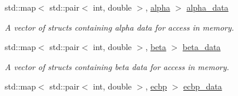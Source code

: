 \begin{DoxyCompactItemize}
\item 
std\+::map$<$ std\+::pair$<$ int, double $>$, \hyperlink{structpyne_1_1alpha}{alpha} $>$ \hyperlink{namespacepyne_a535b6ec192f55087092c07ee478bc11d}{alpha\+\_\+data}\hypertarget{namespacepyne_a535b6ec192f55087092c07ee478bc11d}{}\label{namespacepyne_a535b6ec192f55087092c07ee478bc11d}

\begin{DoxyCompactList}\small\item\em A vector of structs containing alpha data for access in memory. \end{DoxyCompactList}\item 
std\+::map$<$ std\+::pair$<$ int, double $>$, \hyperlink{structpyne_1_1beta}{beta} $>$ \hyperlink{namespacepyne_a5a5d547521d918978adccc01a8cdd10c}{beta\+\_\+data}\hypertarget{namespacepyne_a5a5d547521d918978adccc01a8cdd10c}{}\label{namespacepyne_a5a5d547521d918978adccc01a8cdd10c}

\begin{DoxyCompactList}\small\item\em A vector of structs containing beta data for access in memory. \end{DoxyCompactList}\item 
std\+::map$<$ std\+::pair$<$ int, double $>$, \hyperlink{structpyne_1_1ecbp}{ecbp} $>$ \hyperlink{namespacepyne_a43b4b8a8b73a5e966a55e14a270e98bf}{ecbp\+\_\+data}\hypertarget{namespacepyne_a43b4b8a8b73a5e966a55e14a270e98bf}{}\label{namespacepyne_a43b4b8a8b73a5e966a55e14a270e98bf}


\end{DoxyCompactItemize}
